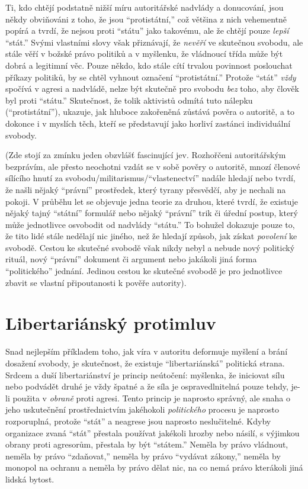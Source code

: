\documentclass{book}
\begin{document}
Ti, kdo chtějí podstatně nižší míru autoritářské nadvlády a donucování, jsou někdy obviňováni z toho, že jsou \enquote{protistátní,} což většina z nich vehementně popírá a tvrdí, že nejsou proti \enquote{státu} jako takovému, ale že chtějí pouze \emph{lepší} \enquote{stát.} Svými vlastními slovy však přiznávají, že \emph{nevěří} ve skutečnou svobodu, ale stále věří v božské právo politiků a v myšlenku, že vládnoucí třída může být dobrá a legitimní věc. Pouze někdo, kdo stále cítí trvalou povinnost poslouchat příkazy politiků, by se chtěl vyhnout označení \enquote{protistátní.} Protože \enquote{stát} \emph{vždy} spočívá v agresi a nadvládě, nelze být skutečně pro svobodu \emph{bez} toho, aby člověk byl proti \enquote{státu.} Skutečnost, že tolik aktivistů odmítá tuto nálepku (\enquote{protistátní}), ukazuje, jak hluboce zakořeněná zůstává pověra o autoritě, a to dokonce i v myslích těch, kteří se představují jako horliví zastánci individuální svobody.

(Zde stojí za zmínku jeden obzvlášť fascinující jev. Rozhořčeni autoritářským bezprávím, ale přesto neochotni vzdát se v sobě pověry o autoritě, mnozí členové sílícího hnutí za svobodu/militarismus/\enquote{vlastenectví} nadále hledají nebo tvrdí, že našli nějaký \enquote{právní} prostředek, který tyrany přesvědčí, aby je nechali na pokoji. V průběhu let se objevuje jedna teorie za druhou, které tvrdí, že existuje nějaký tajný \enquote{státní} formulář nebo nějaký \enquote{právní} trik či úřední postup, který může jednotlivce osvobodit od nadvlády \enquote{státu.} To bohužel dokazuje pouze to, že tito lidé stále nedělají nic jiného, než že hledají způsob, jak získat \emph{povolení} ke svobodě. Cestou ke skutečné svobodě však nikdy nebyl a nebude nový politický rituál, nový \enquote{právní} dokument či argument nebo jakákoli jiná forma \enquote{politického} jednání. Jedinou cestou ke skutečné svobodě je pro jednotlivce zbavit se vlastní připoutanosti k pověře autority).

\section{Libertariánský protimluv}

Snad nejlepším příkladem toho, jak víra v autoritu deformuje myšlení a brání dosažení svobody, je skutečnost, že existuje \enquote{libertariánská} politická strana. Srdcem a duší libertariánství je princip neútočení: myšlenka, že iniciovat sílu nebo podvádět druhé je vždy špatné a že síla je ospravedlnitelná pouze tehdy, je-li použita v \emph{obraně} proti agresi. Tento princip je naprosto správný, ale snaha o jeho uskutečnění prostřednictvím jakéhokoli \emph{politického} procesu je naprosto rozporuplná, protože \enquote{stát} a neagrese jsou naprosto neslučitelné. Kdyby organizace zvaná \enquote{stát} přestala používat jakékoli hrozby nebo násilí, s výjimkou obrany proti agresorům, přestala by být \enquote{státem.} Neměla by právo vládnout, neměla by právo \enquote{zdaňovat,} neměla by právo \enquote{vydávat zákony,} neměla by monopol na ochranu a neměla by právo dělat nic, na co nemá právo kterákoli jiná lidská bytost.
\end{document}
